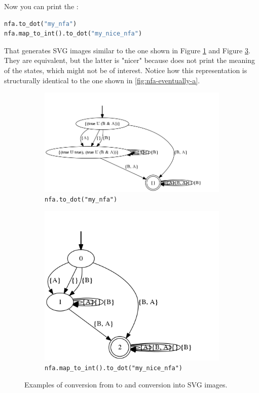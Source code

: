 Now you can print the \NFA:
\begin{lstlisting}[language=Python, style=Python, escapechar = £]
nfa.to_dot("my_nfa")
nfa.map_to_int().to_dot("my_nice_nfa")
\end{lstlisting}
That generates SVG images similar to the one shown in Figure \ref{fig:flloat-to_automaton-example-my-nfa} and Figure \ref{fig:flloat-to_automaton-example-my-nice-nfa}. They are equivalent, but the latter is "nicer" because does not print the meaning of the states, which might not be of interest.
Notice how this representation is structurally identical to the one shown in \ref{fig:nfa-eventually-a}.
\begin{figure}[h]
	\centering
	\begin{subfigure}[b]{0.55\textwidth}
		\includegraphics[width=\textwidth]{images/my_nfa}
		\caption{\texttt{nfa.to\_dot("my\_nfa")}}
		\label{fig:flloat-to_automaton-example-my-nfa}
	\end{subfigure}
	\begin{subfigure}[b]{0.40\textwidth}
		\includegraphics[width=\textwidth]{images/my_nice_nfa}
		\caption{\texttt{nfa.map\_to\_int().to\_dot("my\_nice\_nfa")}}
		\label{fig:flloat-to_automaton-example-my-nice-nfa}
	\end{subfigure}
	\caption{Examples of conversion from \LLf to \NFA and conversion into SVG images.}
\end{figure}

